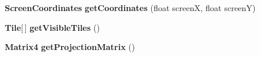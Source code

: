 \begin{DoxyCompactItemize}
\item 
{\bf Screen\-Coordinates} {\bfseries get\-Coordinates} (float screen\-X, float screen\-Y)\label{classde_1_1joglearth_1_1geometry_1_1_camera_a685be4a671f6e7fe6bdec17c1a09f3f1}

\item 
{\bf Tile}[$\,$] {\bfseries get\-Visible\-Tiles} ()\label{classde_1_1joglearth_1_1geometry_1_1_camera_aa4704ce2be569a3551d3f43cf5a44646}

\item 
{\bf Matrix4} {\bfseries get\-Projection\-Matrix} ()\label{classde_1_1joglearth_1_1geometry_1_1_camera_acddc48206fc1c2374010be00f23e0ef7}

\end{DoxyCompactItemize}
